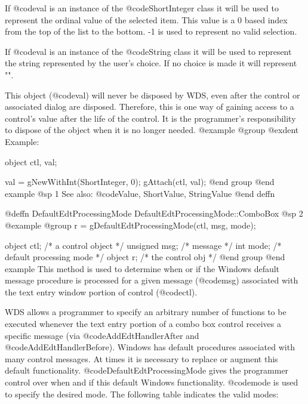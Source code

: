 If @code{val} is an instance of the @code{ShortInteger} class it will
be used to represent the ordinal value of the selected item.  This value
is a 0 based index from the top of the list to the bottom.  -1 is used
to represent no valid selection.

If @code{val} is an instance of the @code{String} class it will be used
to represent the string represented by the user's choice.  If no choice is
made it will represent "".

This object (@code{val}) will never be disposed by WDS, even after
the control or associated dialog are disposed.  Therefore, this
is one way of gaining access to a control's value after the life
of the control.  It is the programmer's responsibility to dispose of
the object when it is no longer needed.
@example
@group
@exdent Example:

object  ctl, val;

val = gNewWithInt(ShortInteger, 0);
gAttach(ctl, val);
@end group
@end example
@sp 1
See also:  @code{Value, ShortValue, StringValue}
@end deffn












@deffn {DefaultEdtProcessingMode} DefaultEdtProcessingMode::ComboBox
@sp 2
@example
@group
r = gDefaultEdtProcessingMode(ctl, msg, mode);

object   ctl;   /*  a control object         */
unsigned msg;   /*  message                  */
int      mode;  /*  default processing mode  */
object   r;     /*  the control obj          */
@end group
@end example
This method is used to determine when or if the Windows default message
procedure is processed for a given message (@code{msg}) associated with
the text entry window portion of control (@code{ctl}).

WDS allows a programmer to specify an arbitrary number of functions to
be executed whenever the text entry portion of a combo box control
receives a specific message (via @code{AddEdtHandlerAfter} and
@code{AddEdtHandlerBefore}).  Windows has default procedures associated
with many control messages.  At times it is necessary to replace or
augment this default functionality.  @code{DefaultEdtProcessingMode}
gives the programmer control over when and if this default Windows
functionality.  @code{mode} is used to specify the desired mode.  The
following table indicates the valid modes:

